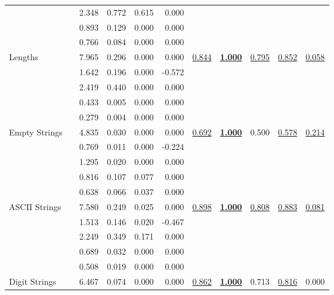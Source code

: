 \begin{tabular}{llrrrrrrrrr}
     & \GPOT{} & 2.348 & 0.772 & 0.615 & 0.000 &  &  &  &  & \\[.2em]
\rowcolor{row}
     & \TARANTULA{}\rowstrut{} & 0.893 & 0.129 & 0.000 & 0.000 &  &  &  &  & \\
\rowcolor{row}
     & \OCHIAI{} & 0.766 & 0.084 & 0.000 & 0.000 &  &  &  &  & \\
\rowcolor{row}
    Lengths & \DSTAR{} & 7.965 & 0.296 & 0.000 & 0.000 & \underline{0.844} & \textbf{\color{deepblue}\underline{1.000}} & \underline{0.795} & \underline{0.852} & \underline{0.058}\\
\rowcolor{row}
     & \NAISHT{} & 1.642 & 0.196 & 0.000 & -0.572 &  &  &  &  & \\
\rowcolor{row}
     & \GPOT{} & 2.419 & 0.440 & 0.000 & 0.000 &  &  &  &  & \\[.2em]
     & \TARANTULA{}\rowstrut{} & 0.433 & 0.005 & 0.000 & 0.000 &  &  &  &  & \\
     & \OCHIAI{} & 0.279 & 0.004 & 0.000 & 0.000 &  &  &  &  & \\
    Empty Strings & \DSTAR{} & 4.835 & 0.030 & 0.000 & 0.000 & \underline{0.692} & \textbf{\color{deepblue}\underline{1.000}} & 0.500 & \underline{0.578} & \underline{0.214}\\
     & \NAISHT{} & 0.769 & 0.011 & 0.000 & -0.224 &  &  &  &  & \\
     & \GPOT{} & 1.295 & 0.020 & 0.000 & 0.000 &  &  &  &  & \\[.2em]
\rowcolor{row}
     & \TARANTULA{}\rowstrut{} & 0.816 & 0.107 & 0.077 & 0.000 &  &  &  &  & \\
\rowcolor{row}
     & \OCHIAI{} & 0.638 & 0.066 & 0.037 & 0.000 &  &  &  &  & \\
\rowcolor{row}
    ASCII Strings & \DSTAR{} & 7.580 & 0.249 & 0.025 & 0.000 & \underline{0.898} & \textbf{\color{deepblue}\underline{1.000}} & \underline{0.808} & \underline{0.883} & \underline{0.081}\\
\rowcolor{row}
     & \NAISHT{} & 1.513 & 0.146 & 0.020 & -0.467 &  &  &  &  & \\
\rowcolor{row}
     & \GPOT{} & 2.249 & 0.349 & 0.171 & 0.000 &  &  &  &  & \\[.2em]
     & \TARANTULA{}\rowstrut{} & 0.689 & 0.032 & 0.000 & 0.000 &  &  &  &  & \\
     & \OCHIAI{} & 0.508 & 0.019 & 0.000 & 0.000 &  &  &  &  & \\
    Digit Strings & \DSTAR{} & 6.467 & 0.074 & 0.000 & 0.000 & \underline{0.862} & \textbf{\color{deepblue}\underline{1.000}} & 0.713 & \underline{0.816} & 0.000\\

\end{tabular}
